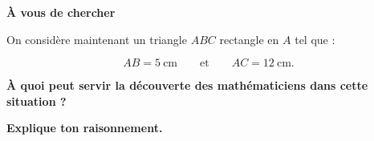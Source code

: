 \documentclass[10pt,a4paper,landscape]{article}
\begin{document}
\begin{minipage}[t]{0.48\textwidth}
\begin{tcolorbox}[
  enhanced,
  colback=ActionC!5,
  colframe=ActionC!60,
  boxrule=0.6pt,
  arc=2mm,
  left=3mm,
  right=3mm,
  top=2mm,
  bottom=2mm,
  before skip=1mm,
  after skip=0mm
]
{\sffamily\bfseries\normalsize\color{ActionC}
À vous de chercher}

\vspace{0.3em}

On considère maintenant un triangle \(ABC\) rectangle en \(A\)
tel que :

\[
AB=5\ \text{cm}
\qquad\text{et}\qquad
AC=12\ \text{cm}.
\]

\vspace{-0.3em}

\textbf{À quoi peut servir la découverte des mathématiciens
dans cette situation ?}

\smallskip

\textbf{Explique ton raisonnement.}

\end{tcolorbox}

\end{minipage}%
\hfill%
\end{document}
